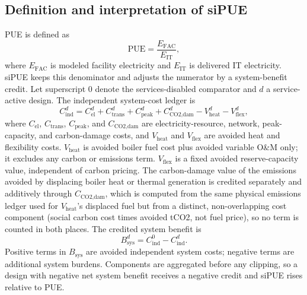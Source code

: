 \documentclass[preprint,12pt]{elsarticle}
\begin{document}
\subsection{Definition and interpretation of siPUE}

PUE is defined as
\begin{equation}
\text{PUE} = \frac{E_{\text{FAC}}}{E_{\text{IT}}},
\end{equation}
where $E_{\text{FAC}}$ is modeled facility electricity and $E_{\text{IT}}$ is delivered IT electricity. siPUE keeps this denominator and adjusts the numerator by a system-benefit credit. Let superscript $0$ denote the services-disabled comparator and $d$ a service-active design. The independent system-cost ledger is
\begin{equation}
C_{\text{ind}}^d =
C_{\text{el}}^d
+ C_{\text{trans}}^d
+ C_{\text{peak}}^d
+ C_{\text{CO2,dam}}^d
- V_{\text{heat}}^d
- V_{\text{flex}}^d ,
\label{eq:independent-cost-ledger}
\end{equation}
where $C_{\text{el}}$, $C_{\text{trans}}$, $C_{\text{peak}}$, and $C_{\text{CO2,dam}}$ are electricity-resource, network, peak-capacity, and carbon-damage costs, and $V_{\text{heat}}$ and $V_{\text{flex}}$ are avoided heat and flexibility costs. $V_{\text{heat}}$ is avoided boiler fuel cost plus avoided variable O\&M only; it excludes any carbon or emissions term. $V_{\text{flex}}$ is a fixed avoided reserve-capacity value, independent of carbon pricing. The carbon-damage value of the emissions avoided by displacing boiler heat or thermal generation is credited separately and additively through $C_{\text{CO2,dam}}$, which is computed from the same physical emissions ledger used for $V_{\text{heat}}$'s displaced fuel but from a distinct, non-overlapping cost component (social carbon cost times avoided tCO2, not fuel price), so no term is counted in both places. The credited system benefit is
\begin{equation}
B_{\text{sys}}^d =
C_{\text{ind}}^0 - C_{\text{ind}}^d .
\label{eq:system-benefit}
\end{equation}
Positive terms in $B_{\text{sys}}$ are avoided independent system costs; negative terms are additional system burdens. Components are aggregated before any clipping, so a design with negative net system benefit receives a negative credit and siPUE rises relative to PUE.
\end{document}

